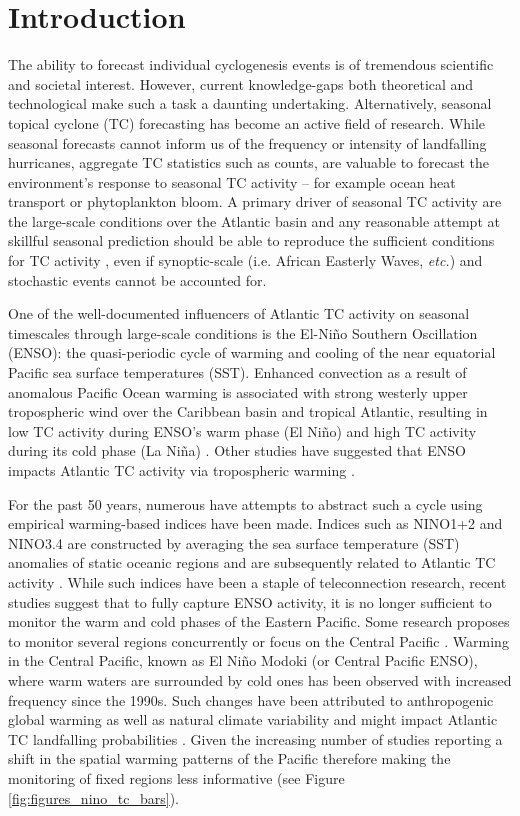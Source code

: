 \section{Introduction}
The ability to forecast individual cyclogenesis events is of tremendous scientific and societal interest. However, current knowledge-gaps both theoretical and technological make such a task a daunting undertaking. Alternatively, seasonal topical cyclone (TC) forecasting has become an active field of research. While seasonal forecasts cannot inform us of the frequency or intensity of landfalling hurricanes, aggregate TC statistics such as counts, are valuable to forecast the environment's response to seasonal TC activity -- for example ocean heat transport or phytoplankton bloom. A primary driver of seasonal TC activity are the large-scale conditions over the Atlantic basin and any reasonable attempt at skillful seasonal prediction should be able to reproduce the sufficient conditions for TC activity \cite{gray1968}, even if synoptic-scale (i.e. African Easterly Waves, \emph{etc.}) and stochastic events cannot be accounted for.

One of the well-documented influencers of Atlantic TC activity on seasonal timescales through large-scale conditions is the El-Ni\~no Southern Oscillation (ENSO): the quasi-periodic cycle of warming and cooling of the near equatorial Pacific sea surface temperatures (SST). Enhanced convection as a result of anomalous Pacific Ocean warming is associated with strong westerly upper tropospheric wind over the Caribbean basin and tropical Atlantic, resulting in low TC activity during ENSO's warm phase (El Ni\~no) and high TC activity during its cold phase (La Ni\~na) \cite{gray1984a}. Other studies have suggested that ENSO impacts Atlantic TC activity via tropospheric warming \cite{tang2004}.

For the past 50 years, numerous have attempts to abstract such a cycle using empirical warming-based indices have been made. Indices such as NINO1+2 and NINO3.4 are constructed by averaging the sea surface temperature (SST) anomalies of static oceanic regions and are subsequently related to Atlantic TC activity \cite{trenberth1997definition}. While such indices have been a staple of teleconnection research, recent studies suggest that to fully capture ENSO activity, it is no longer sufficient to monitor the warm and cold phases of the Eastern Pacific. Some research proposes to monitor several regions concurrently \cite{trenberth2001,ren2011} or focus on the Central Pacific \cite{ashok2007}. Warming in the Central Pacific, known as El Ni\~no Modoki (or Central Pacific ENSO), where warm waters are surrounded by cold ones has been observed with increased frequency since the 1990s. Such changes have been attributed to anthropogenic global warming \cite{yeh2009} as well as natural climate variability \cite{wittenberg2009} and might impact Atlantic TC landfalling probabilities \cite{kim2009}. Given the increasing number of studies reporting a shift in the spatial warming patterns of the Pacific therefore making the monitoring of fixed regions less informative (see Figure \ref{fig:figures_nino_tc_bars}). 



